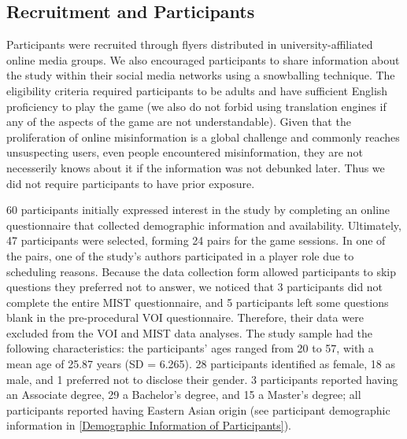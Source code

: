 \subsection{Recruitment and Participants}
Participants were recruited through flyers distributed in university-affiliated online media groups. We also encouraged participants to share information about the study within their social media networks using a snowballing technique. The eligibility criteria required participants to be adults and have sufficient English proficiency to play the game (we also do not forbid using translation engines if any of the aspects of the game are not understandable). Given that the proliferation of online misinformation is a global challenge and commonly reaches unsuspecting users\cite{ferrara2020misinformation}, even people encountered misinformation, they are not necesserily knows about it if the information was not debunked later. Thus 
we did not require participants to have prior exposure.

60 participants initially expressed interest in the study by completing an online questionnaire that collected demographic information and availability. Ultimately, 47 participants were selected, forming 24 pairs for the game sessions. In one of the pairs, one of the study's authors participated in a player role due to scheduling reasons. Because the data collection form allowed participants to skip questions they preferred not to answer, we noticed that 3 participants did not complete the entire MIST questionnaire, and 5 participants left some questions blank in the pre-procedural VOI questionnaire. Therefore, their data were excluded from the VOI and MIST data analyses.
The study sample had the following characteristics: the participants’ ages ranged from 20 to 57, with a mean age of 25.87 years (SD = 6.265). 28 participants identified as female, 18 as male, and 1 preferred not to disclose their gender. 3 participants reported having an Associate degree, 29 a Bachelor's degree, and 15 a Master's degree; all participants reported having Eastern Asian origin (see participant demographic information in \ref{Demographic Information of Participants}).

